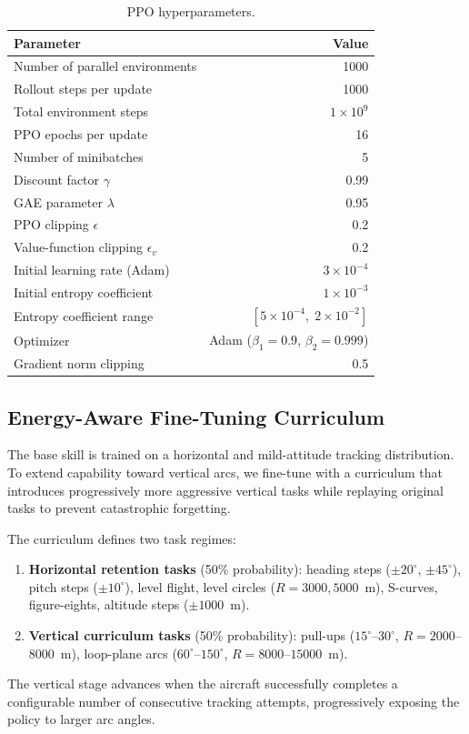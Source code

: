 \documentclass{article}
\begin{document}
\begin{table}[h]
  \centering
  \caption{PPO hyperparameters.}
  \label{tab:ppo-hparams}
  \begin{tabular}{lr}
    \toprule
    \textbf{Parameter} & \textbf{Value} \\
    \midrule
    Number of parallel environments  & 1000 \\
    Rollout steps per update         & 1000 \\
    Total environment steps          & $1 \times 10^9$ \\
    PPO epochs per update            & 16 \\
    Number of minibatches            & 5 \\
    Discount factor $\gamma$         & 0.99 \\
    GAE parameter $\lambda$          & 0.95 \\
    PPO clipping $\epsilon$          & 0.2 \\
    Value-function clipping $\epsilon_{\!v}$ & 0.2 \\
    Initial learning rate (Adam)     & $3 \times 10^{-4}$ \\
    Initial entropy coefficient      & $1 \times 10^{-3}$ \\
    Entropy coefficient range        & $[5 \times 10^{-4},\; 2 \times 10^{-2}]$ \\
    Optimizer                        & Adam ($\beta_1{=}0.9$, $\beta_2{=}0.999$) \\
    Gradient norm clipping           & 0.5 \\
    \bottomrule
  \end{tabular}
\end{table}

\subsection{Energy-Aware Fine-Tuning Curriculum}

The base skill is trained on a horizontal and mild-attitude tracking
distribution.  To extend capability toward vertical arcs, we fine-tune
with a curriculum that introduces progressively more aggressive vertical
tasks while replaying original tasks to prevent catastrophic forgetting.

The curriculum defines two task regimes:
\begin{enumerate}
  \item \textbf{Horizontal retention tasks} (50\% probability): heading
        steps ($\pm 20^\circ$, $\pm 45^\circ$), pitch steps ($\pm 10^\circ$),
        level flight, level circles ($R = 3000,5000$~m), S-curves, figure-eights,
        altitude steps ($\pm 1000$~m).
  \item \textbf{Vertical curriculum tasks} (50\% probability): pull-ups
        ($15^\circ$--$30^\circ$, $R = 2000$--$8000$~m), loop-plane arcs
        ($60^\circ$--$150^\circ$, $R = 8000$--$15000$~m).
\end{enumerate}
The vertical stage advances when the aircraft successfully completes a
configurable number of consecutive tracking attempts, progressively
exposing the policy to larger arc angles.
\end{document}
